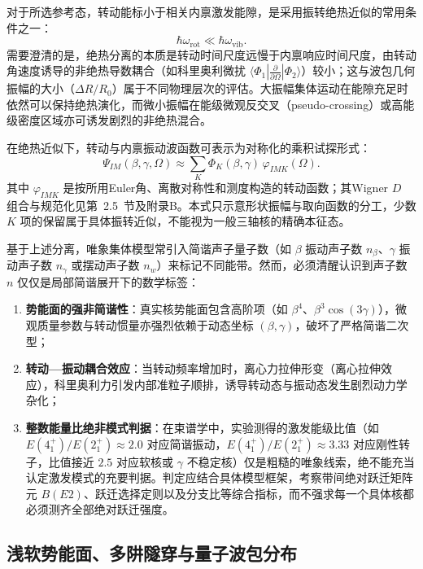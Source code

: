 对于所选参考态，转动能标小于相关内禀激发能隙，是采用振转绝热近似的常用条件之一\cite{book-bohr-mottelson-nuclear-structure-vol2}：
\begin{equation}\label{eq:3-1-adiabatic-condition}
\hbar \omega_{\text{rot}} \ll \hbar \omega_{\text{vib}}.
\end{equation}
需要澄清的是，绝热分离的本质是转动时间尺度远慢于内禀响应时间尺度，由转动角速度诱导的非绝热导数耦合（如科里奥利微扰 $\langle \Phi_1 | \frac{\partial}{\partial \Omega} | \Phi_2 \rangle$）较小；这与波包几何振幅的大小（$\Delta R / R_0$）属于不同物理层次的评估。大振幅集体运动在能隙充足时依然可以保持绝热演化，而微小振幅在能级微观反交叉（pseudo-crossing）或高能级密度区域亦可诱发剧烈的非绝热混合。

在绝热近似下，转动与内禀振动波函数可表示为对称化的乘积试探形式：
\begin{equation}\label{eq:3-1-factorized-wf}
\Psi_{IM}(\beta,\gamma,\Omega)\approx\sum_K\Phi_K(\beta,\gamma)\,\varphi_{IMK}(\Omega).
\end{equation}
其中 $\varphi_{IMK}$ 是按所用Euler角、离散对称性和测度构造的转动函数；其Wigner $D$ 组合与规范化见第~2.5~节及附录B。本式只示意形状振幅与取向函数的分工，少数 $K$ 项的保留属于具体振转近似，不能视为一般三轴核的精确本征态。

基于上述分离，唯象集体模型常引入简谐声子量子数（如 $\beta$ 振动声子数 $n_\beta$、$\gamma$ 振动声子数 $n_\gamma$ 或摆动声子数 $n_w$）来标记不同能带。然而，必须清醒认识到声子数 $n$ 仅仅是局部简谐展开下的数学标签：
\begin{enumerate}
\item \textbf{势能面的强非简谐性}：真实核势能面包含高阶项（如 $\beta^4$、$\beta^3 \cos(3\gamma)$），微观质量参数与转动惯量亦强烈依赖于动态坐标 $(\beta, \gamma)$，破坏了严格简谐二次型；
\item \textbf{转动—振动耦合效应}：当转动频率增加时，离心力拉伸形变（离心拉伸效应），科里奥利力引发内部准粒子顺排，诱导转动态与振动态发生剧烈动力学杂化；
\item \textbf{整数能量比绝非模式判据}：在束谱学中，实验测得的激发能级比值（如 $E(4_1^+)/E(2_1^+) \approx 2.0$ 对应简谐振动，$E(4_1^+)/E(2_1^+) \approx 3.33$ 对应刚性转子，比值接近 $2.5$ 对应软核或 $\gamma$ 不稳定核）仅是粗糙的唯象线索，绝不能充当认定激发模式的充要判据。判定应结合具体模型框架，考察带间绝对跃迁矩阵元 $B(E2)$、跃迁选择定则以及分支比等综合指标，而不强求每一个具体核都必须测齐全部绝对跃迁强度。
\end{enumerate}

\subsection{浅软势能面、多阱隧穿与量子波包分布}\label{sec:3-1-4}

